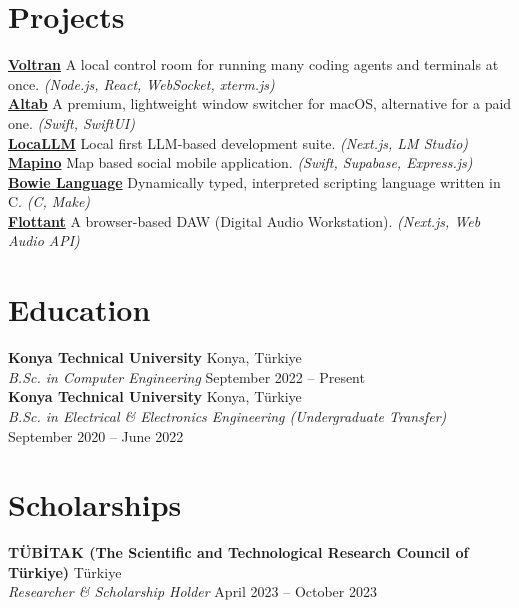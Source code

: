\documentclass[10pt,a4paper]{extarticle}
\begin{document}
\section{Projects}
\textbf{\href{https://github.com/onurravli/voltran}{Voltran}} A local control room for running many coding agents and terminals at once. \textit{(Node.js, React, WebSocket, xterm.js)}\\
\textbf{\href{https://github.com/onurravli/altab}{Altab}} A premium, lightweight window switcher for macOS, alternative for a paid one. \textit{(Swift, SwiftUI)}\\
\textbf{\href{https://github.com/onurravli/locallm}{LocaLLM}} Local first LLM-based development suite. \textit{(Next.js, LM Studio)}\\
\textbf{\href{https://getmapino.com}{Mapino}} Map based social mobile application. \textit{(Swift, Supabase, Express.js)}\\
\textbf{\href{https://github.com/bowie-lang/bowie}{Bowie Language}} Dynamically typed, interpreted scripting language written in C. \textit{(C, Make)}\\
\textbf{\href{https://github.com/onurravli/flottant}{Flottant}} A browser-based DAW (Digital Audio Workstation). \textit{(Next.js, Web Audio API)}

\section{Education}
\textbf{Konya Technical University} \hfill Konya, Türkiye\\
\textit{B.Sc. in Computer Engineering} \hfill September 2022 -- Present\\
\textbf{Konya Technical University} \hfill Konya, Türkiye\\
\textit{B.Sc. in Electrical \& Electronics Engineering (Undergraduate Transfer)} \hfill September 2020 -- June 2022

\section{Scholarships}
\textbf{TÜBİTAK (The Scientific and Technological Research Council of Türkiye)} \hfill Türkiye\\
\textit{Researcher \& Scholarship Holder} \hfill April 2023 -- October 2023
\end{document}
